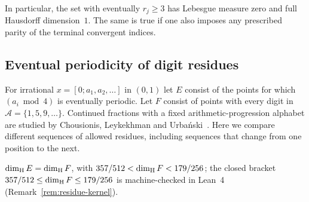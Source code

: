 In particular, the set with eventually $r_j\ge3$ has Lebesgue
measure zero and full Hausdorff dimension~$1$. The same is true if one
also imposes any prescribed parity of the terminal convergent
indices.

\subsection{Eventual periodicity of digit residues}

For irrational $x=[0;a_1,a_2,\ldots]$ in $(0,1)$ let $E$ consist of
the points for which $(a_i\bmod4)$ is eventually periodic. Let $F$
consist of points with every digit in $\mathcal A=\{1,5,9,\ldots\}$.
Continued fractions with a fixed arithmetic-progression alphabet are
studied by Chousionis, Leykekhman and Urba\'nski~\cite{CLU}. Here
we compare different sequences of allowed residues, including sequences
that change from one position to the next.

\begin{theorem}\label{thm:residues}
$\dim_{\mathrm{H}} E=\dim_{\mathrm{H}} F$, with $357/512<\dim_{\mathrm{H}} F<179/256$; the closed bracket
$357/512\le\dim_{\mathrm{H}} F\le179/256$ is machine-checked in Lean~4 (Remark~\ref{rem:residue-kernel}).
\end{theorem}

